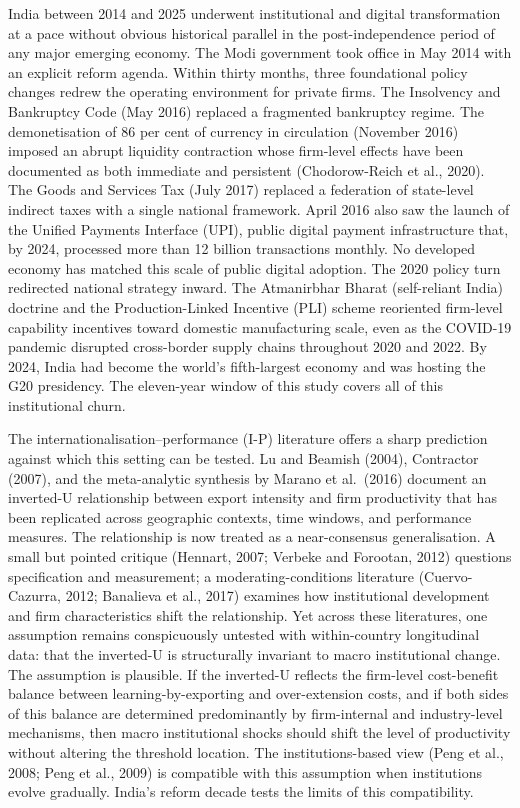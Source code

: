 \documentclass[
  12pt,a4paper]{article}
\begin{document}
India between 2014 and 2025 underwent institutional and digital
transformation at a pace without obvious historical parallel in the
post-independence period of any major emerging economy. The Modi
government took office in May 2014 with an explicit reform agenda.
Within thirty months, three foundational policy changes redrew the
operating environment for private firms. The Insolvency and Bankruptcy
Code (May 2016) replaced a fragmented bankruptcy regime. The
demonetisation of 86 per cent of currency in circulation (November 2016)
imposed an abrupt liquidity contraction whose firm-level effects have
been documented as both immediate and persistent (Chodorow-Reich et al.,
2020). The Goods and Services Tax (July 2017) replaced a federation of
state-level indirect taxes with a single national framework. April 2016
also saw the launch of the Unified Payments Interface (UPI), public
digital payment infrastructure that, by 2024, processed more than 12
billion transactions monthly. No developed economy has matched this
scale of public digital adoption. The 2020 policy turn redirected
national strategy inward. The Atmanirbhar Bharat (self-reliant India)
doctrine and the Production-Linked Incentive (PLI) scheme reoriented
firm-level capability incentives toward domestic manufacturing scale,
even as the COVID-19 pandemic disrupted cross-border supply chains
throughout 2020 and 2022. By 2024, India had become the world's
fifth-largest economy and was hosting the G20 presidency. The
eleven-year window of this study covers all of this institutional churn.

The internationalisation--performance (I-P) literature offers a sharp
prediction against which this setting can be tested. Lu and Beamish
(2004), Contractor (2007), and the meta-analytic synthesis by Marano et
al.~(2016) document an inverted-U relationship between export intensity
and firm productivity that has been replicated across geographic
contexts, time windows, and performance measures. The relationship is
now treated as a near-consensus generalisation. A small but pointed
critique (Hennart, 2007; Verbeke and Forootan, 2012) questions
specification and measurement; a moderating-conditions literature
(Cuervo-Cazurra, 2012; Banalieva et al., 2017) examines how
institutional development and firm characteristics shift the
relationship. Yet across these literatures, one assumption remains
conspicuously untested with within-country longitudinal data: that the
inverted-U is structurally invariant to macro institutional change. The
assumption is plausible. If the inverted-U reflects the firm-level
cost-benefit balance between learning-by-exporting and over-extension
costs, and if both sides of this balance are determined predominantly by
firm-internal and industry-level mechanisms, then macro institutional
shocks should shift the level of productivity without altering the
threshold location. The institutions-based view (Peng et al., 2008; Peng
et al., 2009) is compatible with this assumption when institutions
evolve gradually. India's reform decade tests the limits of this
compatibility.
\end{document}
